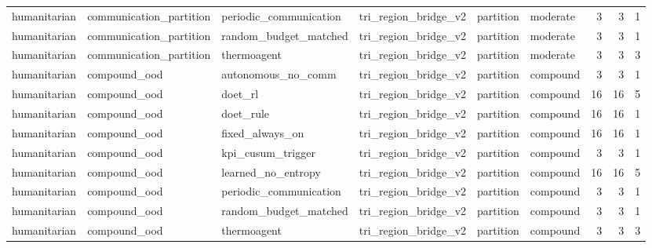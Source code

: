 \begin{table}
\begin{tabular}{llllllrrr}
humanitarian & communication\_partition & periodic\_communication & tri\_region\_bridge\_v2 &     partition &   moderate &         3 &                         3 &                         1 \\
humanitarian & communication\_partition &  random\_budget\_matched & tri\_region\_bridge\_v2 &     partition &   moderate &         3 &                         3 &                         1 \\
humanitarian & communication\_partition &            thermoagent & tri\_region\_bridge\_v2 &     partition &   moderate &         3 &                         3 &                         3 \\
humanitarian &            compound\_ood &     autonomous\_no\_comm & tri\_region\_bridge\_v2 &     partition &   compound &         3 &                         3 &                         1 \\
humanitarian &            compound\_ood &                doet\_rl & tri\_region\_bridge\_v2 &     partition &   compound &        16 &                        16 &                         5 \\
humanitarian &            compound\_ood &              doet\_rule & tri\_region\_bridge\_v2 &     partition &   compound &        16 &                        16 &                         1 \\
humanitarian &            compound\_ood &        fixed\_always\_on & tri\_region\_bridge\_v2 &     partition &   compound &        16 &                        16 &                         1 \\
humanitarian &            compound\_ood &      kpi\_cusum\_trigger & tri\_region\_bridge\_v2 &     partition &   compound &         3 &                         3 &                         1 \\
humanitarian &            compound\_ood &     learned\_no\_entropy & tri\_region\_bridge\_v2 &     partition &   compound &        16 &                        16 &                         5 \\
humanitarian &            compound\_ood & periodic\_communication & tri\_region\_bridge\_v2 &     partition &   compound &         3 &                         3 &                         1 \\
humanitarian &            compound\_ood &  random\_budget\_matched & tri\_region\_bridge\_v2 &     partition &   compound &         3 &                         3 &                         1 \\
humanitarian &            compound\_ood &            thermoagent & tri\_region\_bridge\_v2 &     partition &   compound &         3 &                         3 &                         3 \\

\end{tabular}
\end{table}
